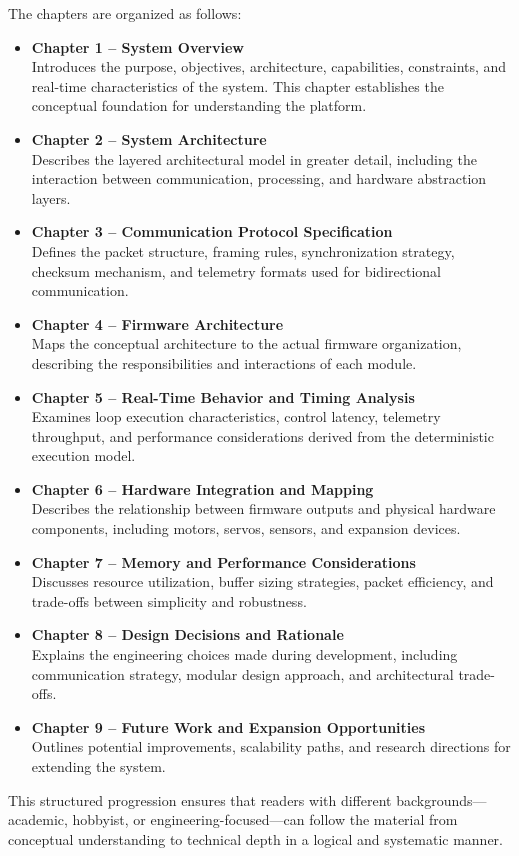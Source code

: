 The chapters are organized as follows:

\begin{itemize}
	\item \textbf{Chapter 1 – System Overview} \\
	Introduces the purpose, objectives, architecture, capabilities, constraints, and real-time characteristics of the system. This chapter establishes the conceptual foundation for understanding the platform.
	
	\item \textbf{Chapter 2 – System Architecture} \\
	Describes the layered architectural model in greater detail, including the interaction between communication, processing, and hardware abstraction layers.
	
	\item \textbf{Chapter 3 – Communication Protocol Specification} \\
	Defines the packet structure, framing rules, synchronization strategy, checksum mechanism, and telemetry formats used for bidirectional communication.
	
	\item \textbf{Chapter 4 – Firmware Architecture} \\
	Maps the conceptual architecture to the actual firmware organization, describing the responsibilities and interactions of each module.
	
	\item \textbf{Chapter 5 – Real-Time Behavior and Timing Analysis} \\
	Examines loop execution characteristics, control latency, telemetry throughput, and performance considerations derived from the deterministic execution model.
	
	\item \textbf{Chapter 6 – Hardware Integration and Mapping} \\
	Describes the relationship between firmware outputs and physical hardware components, including motors, servos, sensors, and expansion devices.
	
	\item \textbf{Chapter 7 – Memory and Performance Considerations} \\
	Discusses resource utilization, buffer sizing strategies, packet efficiency, and trade-offs between simplicity and robustness.
	
	\item \textbf{Chapter 8 – Design Decisions and Rationale} \\
	Explains the engineering choices made during development, including communication strategy, modular design approach, and architectural trade-offs.
	
	\item \textbf{Chapter 9 – Future Work and Expansion Opportunities} \\
	Outlines potential improvements, scalability paths, and research directions for extending the system.
\end{itemize}

This structured progression ensures that readers with different backgrounds—academic, hobbyist, or engineering-focused—can follow the material from conceptual understanding to technical depth in a logical and systematic manner.